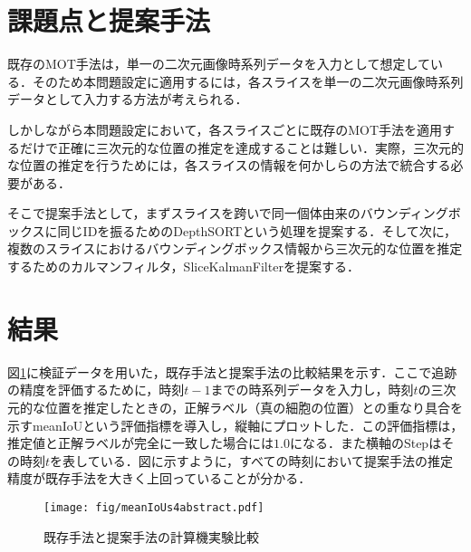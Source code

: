 \section{課題点と提案手法}

既存のMOT手法は，単一の二次元画像時系列データを入力として想定している．そのため本問題設定に適用するには，各スライスを単一の二次元画像時系列データとして入力する方法が考えられる．

しかしながら本問題設定において，各スライスごとに既存のMOT手法を適用するだけで正確に三次元的な位置の推定を達成することは難しい．実際，三次元的な位置の推定を行うためには，各スライスの情報を何かしらの方法で統合する必要がある．

そこで提案手法として，まずスライスを跨いで同一個体由来のバウンディングボックスに同じIDを振るためのDepthSORTという処理を提案する．そして次に，複数のスライスにおけるバウンディングボックス情報から三次元的な位置を推定するためのカルマンフィルタ，SliceKalmanFilterを提案する．

\section{結果}

図\ref{fig:meanIoUs}に検証データを用いた，既存手法と提案手法の比較結果を示す．ここで追跡の精度を評価するために，時刻$t-1$までの時系列データを入力し，時刻$t$の三次元的な位置を推定したときの，正解ラベル（真の細胞の位置）との重なり具合を示すmeanIoUという評価指標を導入し，縦軸にプロットした．この評価指標は，推定値と正解ラベルが完全に一致した場合には$1.0$になる．また横軸のStepはその時刻$t$を表している．図に示すように，すべての時刻において提案手法の推定精度が既存手法を大きく上回っていることが分かる．

\begin{figure}[h]
    \centering
    \texttt{[image: fig/meanIoUs4abstract.pdf]}
    \caption{既存手法と提案手法の計算機実験比較}
    \label{fig:meanIoUs}
\end{figure}
